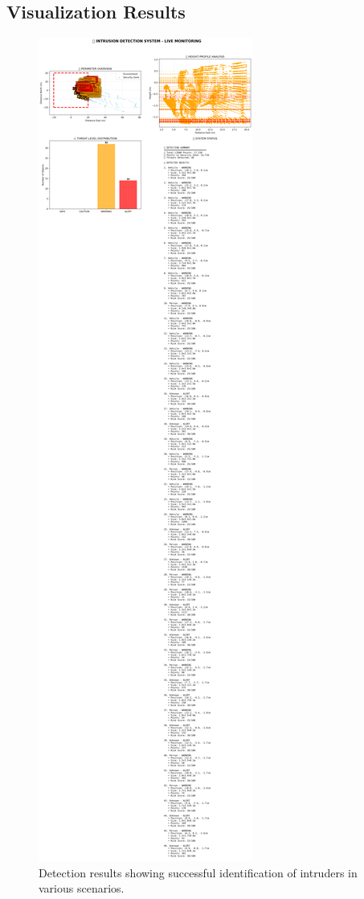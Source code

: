 \documentclass[conference]{IEEEtran}
\begin{document}
\subsection{Visualization Results}
\begin{figure}[htbp]
\centering
\includegraphics[width=\columnwidth]{intrusion_detection_analysis.png}
\caption{Detection results showing successful identification of intruders in various scenarios.}
\label{fig:results}
\end{figure}
\end{document}
